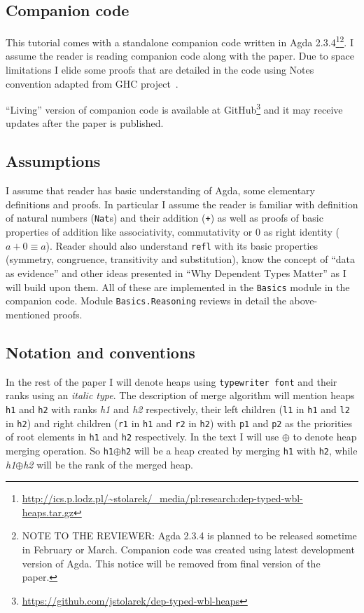 \subsection{Companion code}

This tutorial comes with a standalone companion code written in Agda 2.3.4\footnote{\url{http://ics.p.lodz.pl/~stolarek/_media/pl:research:dep-typed-wbl-heaps.tar.gz}}\footnote{NOTE TO THE REVIEWER: Agda 2.3.4 is planned to be released sometime in February or March. Companion code was created using latest development version of Agda. This notice will be removed from final version of the paper.}. I assume the reader is reading companion code along with the paper. Due to space limitations I elide some proofs that are detailed in the code using Notes convention adapted from GHC project~\cite{MarPey12}.

``Living'' version of companion code is available at GitHub\footnote{\url{https://github.com/jstolarek/dep-typed-wbl-heaps}} and it may receive updates after the paper is published.

\subsection{Assumptions}

I assume that reader has basic understanding of Agda, some elementary definitions and proofs. In particular I assume the reader is familiar with definition of natural numbers (\texttt{Nat}s) and their addition (\texttt{+}) as well as proofs of basic properties of addition like associativity, commutativity or 0 as right identity ($a + 0 ≡ a$). Reader should also understand \texttt{refl} with its basic properties (symmetry, congruence, transitivity and substitution), know the concept of ``data as evidence'' and other ideas presented in ``Why Dependent Types Matter'' \cite{AltMcBMcK05} as I will build upon them. All of these are implemented in the \texttt{Basics} module in the companion code. Module \texttt{Basics.Reasoning} reviews in detail the above-mentioned proofs.

\subsection{Notation and conventions}

In the rest of the paper I will denote heaps using \texttt{typewriter font} and their ranks using an \textit{italic type}. The description of merge algorithm will mention heaps \texttt{h1} and \texttt{h2} with ranks \textit{h1} and \textit{h2} respectively, their left children (\texttt{l1} in \texttt{h1} and \texttt{l2} in \texttt{h2}) and right children (\texttt{r1} in \texttt{h1} and \texttt{r2} in \texttt{h2}) with \texttt{p1} and \texttt{p2} as the priorities of root elements in \texttt{h1} and \texttt{h2} respectively. In the text I will use $\oplus$ to denote heap merging operation. So \texttt{h1}$\oplus$\texttt{h2} will be a heap created by merging \texttt{h1} with \texttt{h2}, while \textit{h1}$\oplus$\textit{h2} will be the rank of the merged heap.


